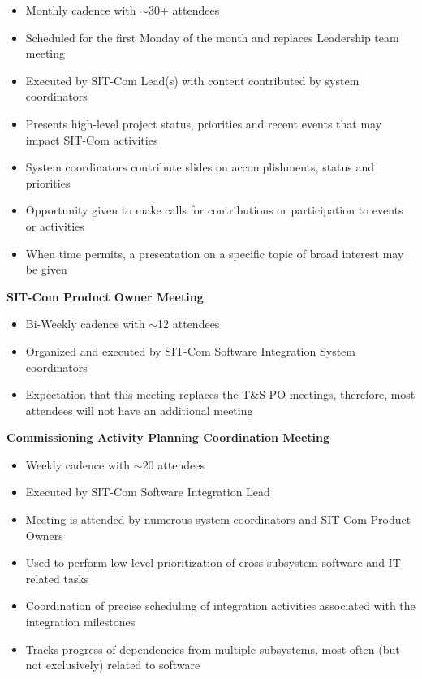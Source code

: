 \documentclass[SE,lsstdraft,authoryear,toc]{lsstdoc, lsstdraft}
\begin{document}
\begin{itemize}
    \item Monthly cadence with $\sim$30+ attendees
    \item Scheduled for the first Monday of the month and replaces Leadership team meeting
    \item Executed by SIT-Com Lead(s) with content contributed by system coordinators
    \item Presents high-level project status, priorities and recent events that may impact SIT-Com activities
    \item System coordinators contribute slides on accomplishments, status and priorities
    \item Opportunity given to make calls for contributions or participation to events or activities
    \item When time permits, a presentation on a specific topic of broad interest may be given
\end{itemize}

\textbf{SIT-Com Product Owner Meeting}
\begin{itemize}
    \item Bi-Weekly cadence with $\sim$12 attendees
    \item Organized and executed by SIT-Com Software Integration System coordinators
    \item Expectation that this meeting replaces the T\&S PO meetings, therefore, most attendees will not have an additional meeting
\end{itemize}


\textbf{Commissioning Activity Planning Coordination Meeting}
\begin{itemize}
    \item Weekly cadence with $\sim$20 attendees
    \item Executed by SIT-Com Software Integration Lead
    \item Meeting is attended by numerous system coordinators and SIT-Com Product Owners
    \item Used to perform low-level prioritization of cross-subsystem software and IT related tasks
    \item Coordination of precise scheduling of  integration activities associated with the integration milestones
    \item Tracks progress of dependencies from multiple subsystems, most often (but not exclusively) related to software
\end{itemize}
\end{document}
